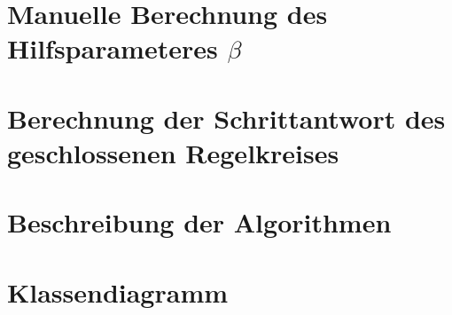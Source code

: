 \clearpage
\section{Manuelle Berechnung des Hilfsparameteres $\beta$}
\label{app:beta}


\clearpage
\section{Berechnung der Schrittantwort des geschlossenen Regelkreises}
\label{app:fft}


\clearpage
\section{Beschreibung der Algorithmen}
\label{app:algos}


\clearpage
\section{Klassendiagramm}
\clearpage
\label{app:classdiagram}

